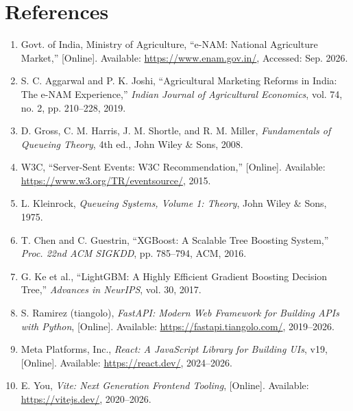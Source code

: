 \chapter{References}

\begin{enumerate}

\item Govt. of India, Ministry of Agriculture, ``e-NAM: National Agriculture Market,'' [Online]. Available: \url{https://www.enam.gov.in/}, Accessed: Sep. 2026.

\item S. C. Aggarwal and P. K. Joshi, ``Agricultural Marketing Reforms in India: The e-NAM Experience,'' \textit{Indian Journal of Agricultural Economics}, vol. 74, no. 2, pp. 210--228, 2019.

\item D. Gross, C. M. Harris, J. M. Shortle, and R. M. Miller, \textit{Fundamentals of Queueing Theory}, 4th ed., John Wiley \& Sons, 2008.

\item W3C, ``Server-Sent Events: W3C Recommendation,'' [Online]. Available: \url{https://www.w3.org/TR/eventsource/}, 2015.

\item L. Kleinrock, \textit{Queueing Systems, Volume 1: Theory}, John Wiley \& Sons, 1975.

\item T. Chen and C. Guestrin, ``XGBoost: A Scalable Tree Boosting System,'' \textit{Proc. 22nd ACM SIGKDD}, pp. 785--794, ACM, 2016.

\item G. Ke et al., ``LightGBM: A Highly Efficient Gradient Boosting Decision Tree,'' \textit{Advances in NeurIPS}, vol. 30, 2017.

\item S. Ramirez (tiangolo), \textit{FastAPI: Modern Web Framework for Building APIs with Python}, [Online]. Available: \url{https://fastapi.tiangolo.com/}, 2019--2026.

\item Meta Platforms, Inc., \textit{React: A JavaScript Library for Building UIs}, v19, [Online]. Available: \url{https://react.dev/}, 2024--2026.

\item E. You, \textit{Vite: Next Generation Frontend Tooling}, [Online]. Available: \url{https://vitejs.dev/}, 2020--2026.


\end{enumerate}
